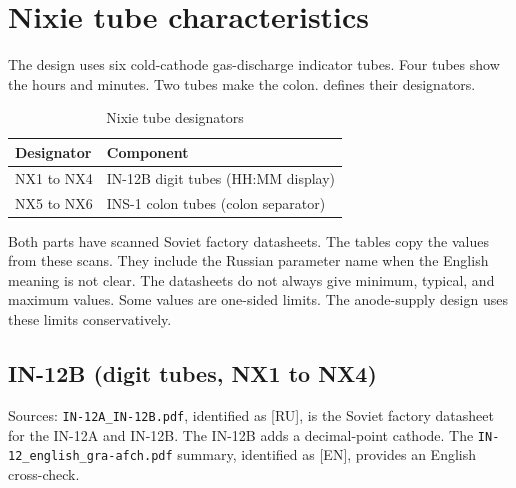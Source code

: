 \section{Nixie tube characteristics}
\label{sec:tubes}

The design uses six cold-cathode gas-discharge indicator tubes. Four tubes show
the hours and minutes. Two tubes make the colon. 
defines their designators.

\begin{table}[htbp]
\centering
\caption{Nixie tube designators}\label{tab:tube-designators}
\begin{tabular}{|l|l|}
\hline
\textbf{Designator} & \textbf{Component} \\
\hline
NX1 to NX4 & IN-12B digit tubes (HH:MM display) \\
\hline
NX5 to NX6 & INS-1 colon tubes (colon separator) \\
\hline
\end{tabular}
\end{table}

Both parts have scanned Soviet factory datasheets. The tables copy the values
from these scans. They include the Russian parameter name when the English
meaning is not clear. The datasheets do not always give minimum, typical, and
maximum values. Some values are one-sided limits. The anode-supply design uses
these limits conservatively.

\subsection{IN-12B (digit tubes, NX1 to NX4)}
\label{sec:in12b}

Sources: \texttt{IN-12A\_IN-12B.pdf}, identified as [RU], is the Soviet factory
datasheet for the IN-12A and IN-12B. The IN-12B adds a decimal-point cathode.
The \texttt{IN-12\_english\_gra-afch.pdf} summary, identified as [EN], provides
an English cross-check.

